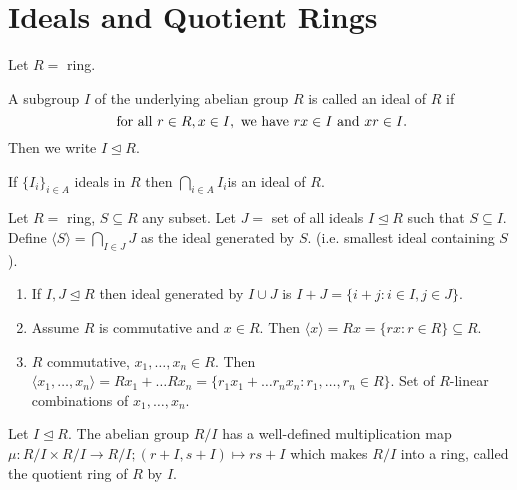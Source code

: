 \section{Ideals and Quotient Rings}

Let \(R = \) ring.

\begin{definition}[Ideals]
    A subgroup \(I\) of the underlying abelian group \(R\) is called an ideal of \(R\) if
    \[\text{ for all } r \in R, x \in I, \text{ we have } rx \in I \text{ and } xr \in I.\]
    Then we write \(I \trianglelefteq R\).
\end{definition}


\begin{lemma}
    If \(\{I_i\}_{i \in A}\) ideals in \(R\) then \(\bigcap_{i \in A} I_i\)is an ideal of \(R\).
\end{lemma}

\begin{corollary}
    Let \(R = \) ring, \(S \subseteq R\) any subset. Let \(J = \) set of all ideals \(I \trianglelefteq R\) such that \(S \subseteq I\). Define \(\langle S \rangle = \bigcap_{I \in J} J\) as the ideal generated by \(S\). (i.e. smallest ideal containing \(S\)).
\end{corollary}

\begin{proposition}
    \begin{enumerate}
        \item If \(I, J \trianglelefteq R\) then ideal generated by \(I \cup J\) is \(I + J = \{i + j: i \in I, j \in J\}\).
        \item Assume \(R\) is commutative and \(x \in R\). Then \(\langle x \rangle = Rx = \{rx : r \in R\} \subseteq R\).
        \item \(R\) commutative, \(x_1, \dots, x_n \in R\). Then \(\langle x_1, \dots, x_n \rangle = Rx_1 + \dots Rx_n = \{r_1x_1 + \dots r_nx_n : r_1, \dots, r_n \in R\}\). Set of \(R\)-linear combinations of \(x_1, \dots, x_n\).
    \end{enumerate}
\end{proposition}

\begin{prop-defn}
Let \(I \trianglelefteq R\). The abelian group \(R / I\) has a well-defined multiplication map \(\mu: R / I \times R / I \to R / I; (r + I, s + I) \mapsto rs + I\) which makes \(R / I\) into a ring, called the quotient ring of \(R\) by \(I\).
\end{prop-defn}

